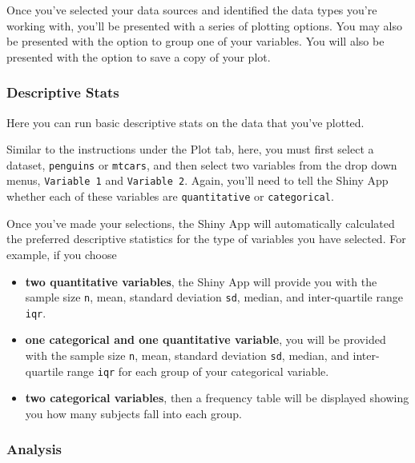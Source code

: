\documentclass[
]{book}
\providecommand{\tightlist}{%
  \setlength{\itemsep}{0pt}\setlength{\parskip}{0pt}}
\begin{document}
Once you've selected your data sources and identified the data types you're working with, you'll be presented with a series of plotting options. You may also be presented with the option to group one of your variables. You will also be presented with the option to save a copy of your plot.

\hypertarget{descriptive-stats-1}{%
\subsubsection*{Descriptive Stats}\label{descriptive-stats-1}}

Here you can run basic descriptive stats on the data that you've plotted.

Similar to the instructions under the Plot tab, here, you must first select a dataset, \texttt{penguins} or \texttt{mtcars}, and then select two variables from the drop down menus, \texttt{Variable\ 1} and \texttt{Variable\ 2}. Again, you'll need to tell the Shiny App whether each of these variables are \texttt{quantitative} or \texttt{categorical}.

Once you've made your selections, the Shiny App will automatically calculated the preferred descriptive statistics for the type of variables you have selected. For example, if you choose

\begin{itemize}
\tightlist
\item
  \textbf{two quantitative variables}, the Shiny App will provide you with the sample size \texttt{n}, mean, standard deviation \texttt{sd}, median, and inter-quartile range \texttt{iqr}.
\item
  \textbf{one categorical and one quantitative variable}, you will be provided with the sample size \texttt{n}, mean, standard deviation \texttt{sd}, median, and inter-quartile range \texttt{iqr} for each group of your categorical variable.
\item
  \textbf{two categorical variables}, then a frequency table will be displayed showing you how many subjects fall into each group.
\end{itemize}

\hypertarget{analysis-1}{%
\subsubsection*{Analysis}\label{analysis-1}}
\end{document}
